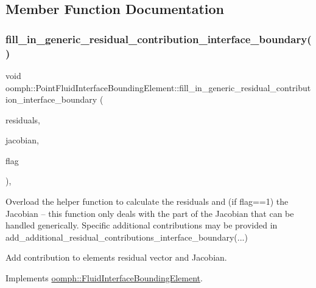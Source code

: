 \subsection{Member Function Documentation}
\mbox{\label{classoomph_1_1PointFluidInterfaceBoundingElement_aad95a7d6f4e4349ee1136e623aa69c88}} 
\subsubsection{\texorpdfstring{fill\+\_\+in\+\_\+generic\+\_\+residual\+\_\+contribution\+\_\+interface\+\_\+boundary()}{fill\_in\_generic\_residual\_contribution\_interface\_boundary()}}
{\footnotesize\ttfamily void oomph\+::\+Point\+Fluid\+Interface\+Bounding\+Element\+::fill\+\_\+in\+\_\+generic\+\_\+residual\+\_\+contribution\+\_\+interface\+\_\+boundary (\begin{DoxyParamCaption}\item[{Vector$<$ double $>$ \&}]{residuals,  }\item[{Dense\+Matrix$<$ double $>$ \&}]{jacobian,  }\item[{unsigned}]{flag }\end{DoxyParamCaption})\hspace{0.3cm}{\ttfamily [protected]}, {\ttfamily [virtual]}}



Overload the helper function to calculate the residuals and (if flag==1) the Jacobian -- this function only deals with the part of the Jacobian that can be handled generically. Specific additional contributions may be provided in add\+\_\+additional\+\_\+residual\+\_\+contributions\+\_\+interface\+\_\+boundary(...) 

Add contribution to element\textquotesingle{}s residual vector and Jacobian. 

Implements \hyperlink{classoomph_1_1FluidInterfaceBoundingElement_a69fa099e0cbfe8ae028a4edc77fedc60}{oomph\+::\+Fluid\+Interface\+Bounding\+Element}.



